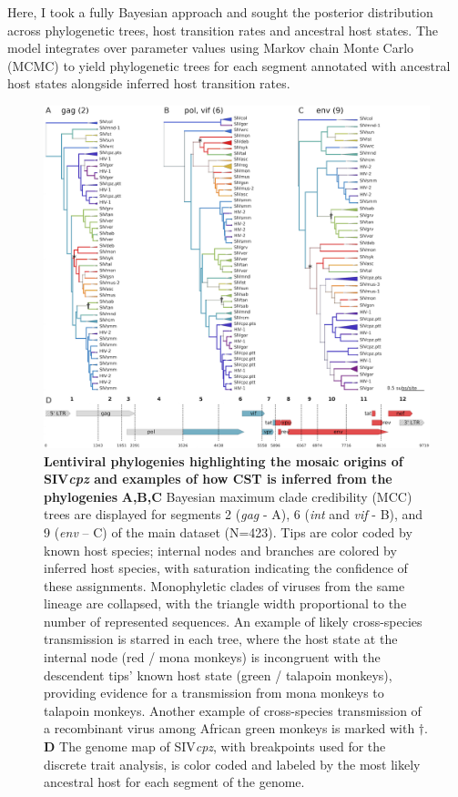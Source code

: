 Here, I took a fully Bayesian approach and sought the posterior distribution across phylogenetic trees, host transition rates and ancestral host states.
The model integrates over parameter values using Markov chain Monte Carlo (MCMC) to yield phylogenetic trees for each segment annotated with ancestral host states alongside inferred host transition rates.

\begin{figure}[h!]
  \begin{centering}
    \includegraphics[width=.8\linewidth]{./png/siv_cpz.png}
  	\caption[Lentiviral phylogenies highlighting the mosaic origins of SIV\textit{cpz}]{\textbf{Lentiviral phylogenies highlighting the mosaic origins of SIV\textit{cpz} and examples of how CST is inferred from the phylogenies }
\textbf{A,B,C} Bayesian maximum clade credibility (MCC) trees are displayed for segments 2 (\textit{gag} - A), 6 (\textit{int} and \textit{vif} - B), and 9 (\textit{env} – C) of the main dataset (N=423).
Tips are color coded by known host species; internal nodes and branches are colored by inferred host species, with saturation indicating the confidence of these assignments.
Monophyletic clades of viruses from the same lineage are collapsed, with the triangle width proportional to the number of represented sequences.
An example of likely cross-species transmission is starred in each tree, where the host state at the internal node (red / mona monkeys) is incongruent with the descendent tips' known host state (green / talapoin monkeys), providing evidence for a transmission from mona monkeys to talapoin monkeys.
Another example of cross-species transmission of a recombinant virus among African green monkeys is marked with $\dagger$.
\textbf{D} The genome map of SIV\textit{cpz}, with breakpoints used for the discrete trait analysis, is color coded and labeled by the most likely ancestral host for each segment of the genome.
}
  	\label{siv_cpz}
  \end{centering}
\end{figure}

